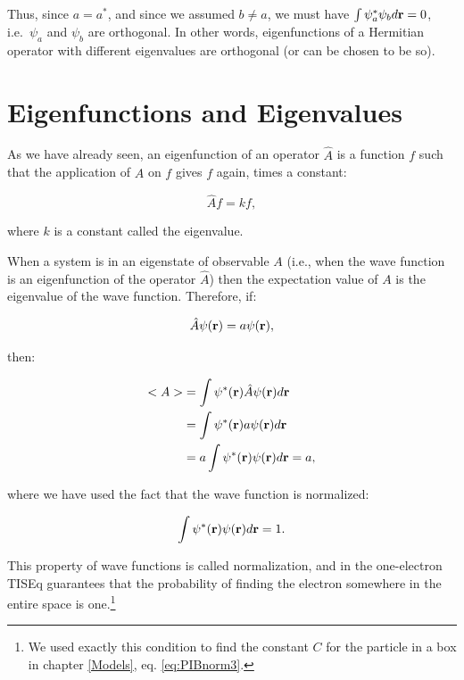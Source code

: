 \documentclass[
  english,
  9pt,
]{extbook}
\theoremstyle{definition}
\theoremstyle{definition}
\theoremstyle{definition}
\theoremstyle{definition}
\theoremstyle{remark}
\begin{document}
Thus, since \(a = a^{*}\), and since we assumed \(b \neq a\), we must have \(\int \psi_a^{*} \psi_b d{\bf r} = 0\), i.e.~\(\psi_a\) and \(\psi_b\) are orthogonal. In other words, eigenfunctions of a Hermitian operator with different eigenvalues are orthogonal (or can be chosen to be so).

\section{Eigenfunctions and Eigenvalues}\label{eigenfunctions-and-eigenvalues}

As we have already seen, an eigenfunction of an operator \(\hat{A}\) is a function \(f\) such that the application of \(\hat{A}\) on \(f\) gives \(f\) again, times a constant:

\begin{equation}
\hat{A} f = k f,
\label{eq:ee1}
\end{equation}

where \(k\) is a constant called the eigenvalue.

When a system is in an eigenstate of observable \(A\) (i.e., when the wave function is an eigenfunction of the operator \(\hat{A}\)) then the expectation value of \(A\) is the eigenvalue of the wave function. Therefore, if:

\begin{equation}
\hat{A} \psi({\bf r}) = a \psi({\bf r}),
\label{eq:ee2}
\end{equation}

then:

\begin{equation}
\begin{aligned}
<A> &= \int \psi^{*}({\bf r}) \hat{A} \psi({\bf r}) d{\bf r} \\
&= \int \psi^{*}({\bf r}) a \psi({\bf r}) d{\bf r} \\    
&= a \int \psi^{*}({\bf r}) \psi({\bf r}) d{\bf r} = a,  
\end{aligned}
\label{eq:ee3}
\end{equation}

where we have used the fact that the wave function is normalized:

\begin{equation}
\int \psi^{*}({\bf r}) \psi({\bf r}) d{\bf r} = 1.
\label{eq:ee4}
\end{equation}

This property of wave functions is called normalization, and in the one-electron TISEq guarantees that the probability of finding the electron somewhere in the entire space is one.\footnote{We used exactly this condition to find the constant \(C\) for the particle in a box in chapter \ref{Models}, eq. \eqref{eq:PIBnorm3}.}
\end{document}
